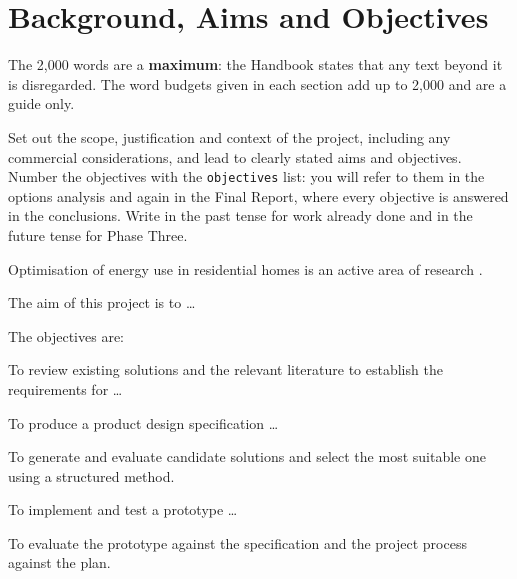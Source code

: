 \section{Background, Aims and Objectives}
\label{sec:background}

\begin{guidance}
The 2,000 words are a \textbf{maximum}: the Handbook states that any text
beyond it is disregarded. The word budgets given in each section add up to
2,000 and are a guide only.

Set out the scope, justification and context of the project, including any
commercial considerations, and lead to clearly stated aims and objectives.
Number the objectives with the \texttt{objectives} list: you will refer to
them in the options analysis and again in the Final Report, where every
objective is answered in the conclusions. Write in the past tense for work
already done and in the future tense for Phase Three.
\end{guidance}

Optimisation of energy use in residential homes is an active area of
research \parencite{bausch2014}. 

The aim of this project is to \ldots

The objectives are:
\begin{objectives}
  \item\label{obj:review} To review existing solutions and the relevant
    literature to establish the requirements for \ldots
  \item\label{obj:spec} To produce a product design specification \ldots
  \item\label{obj:design} To generate and evaluate candidate solutions and
    select the most suitable one using a structured method.
  \item\label{obj:build} To implement and test a prototype \ldots
  \item\label{obj:evaluate} To evaluate the prototype against the
    specification and the project process against the plan.
\end{objectives}
